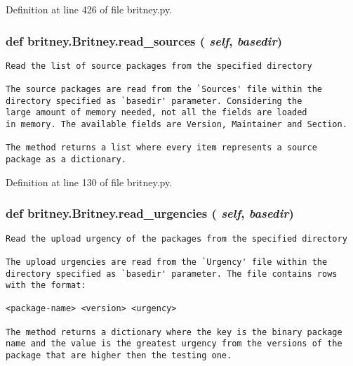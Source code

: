 Definition at line 426 of file britney.py.
\subsubsection{\setlength{\rightskip}{0pt plus 5cm}def britney.Britney.read\_\-sources ( {\em self},  {\em basedir})}\label{classbritney_1_1Britney_054f44c47f17c0c4f5a069e821b7f868}




\footnotesize\begin{verbatim}Read the list of source packages from the specified directory

The source packages are read from the `Sources' file within the
directory specified as `basedir' parameter. Considering the
large amount of memory needed, not all the fields are loaded
in memory. The available fields are Version, Maintainer and Section.

The method returns a list where every item represents a source
package as a dictionary.
\end{verbatim}
\normalsize
 

Definition at line 130 of file britney.py.
\subsubsection{\setlength{\rightskip}{0pt plus 5cm}def britney.Britney.read\_\-urgencies ( {\em self},  {\em basedir})}\label{classbritney_1_1Britney_09fc27899506b4830b1961f125a7b6a4}




\footnotesize\begin{verbatim}Read the upload urgency of the packages from the specified directory

The upload urgencies are read from the `Urgency' file within the
directory specified as `basedir' parameter. The file contains rows
with the format:

<package-name> <version> <urgency>

The method returns a dictionary where the key is the binary package
name and the value is the greatest urgency from the versions of the
package that are higher then the testing one.
\end{verbatim}
\normalsize
 

